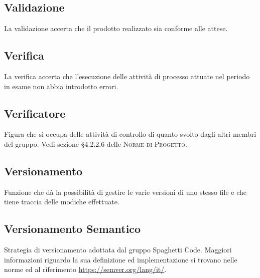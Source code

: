 \documentclass[../glossario.tex]{subfiles}
\begin{document}
\subsection*{Validazione}
{}
La validazione accerta che il prodotto realizzato sia conforme alle attese.

\subsection*{Verifica}
{}
La verifica accerta che l’esecuzione delle attività di processo attuate nel periodo in esame non abbia introdotto errori.

\subsection*{Verificatore}
{}
Figura che si occupa delle attività di controllo di quanto svolto dagli altri membri del gruppo. Vedi sezione \S4.2.2.6 delle \textsc{Norme di Progetto}.

\subsection*{Versionamento}
{}
Funzione che dà la possibilità di gestire le varie versioni di uno stesso file e che tiene traccia delle modiche effettuate.

\subsection*{Versionamento Semantico}
{}
Strategia di versionamento adottata dal gruppo Spaghetti Code. Maggiori informazioni riguardo la sua definizione ed implementazione si trovano nelle norme ed al riferimento \url{https://semver.org/lang/it/}.
\end{document}
